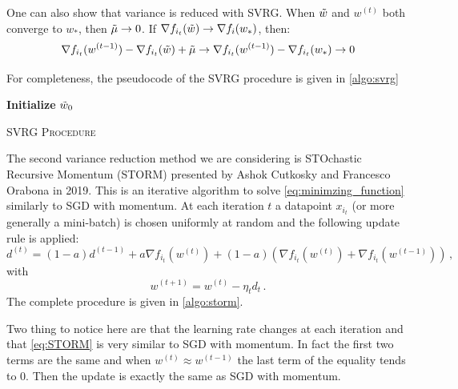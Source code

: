 \documentclass[a4paper,11pt,oneside]{report}
\begin{document}
One can also show that variance is reduced with SVRG. When $\Tilde{w}$ and $w^{(t)}$ both converge to $w_{\ast}$, then $\Tilde{\mu} \rightarrow 0$. If $\nabla f_{i_t}(\Tilde{w}) \rightarrow \nabla f_i(w_{\ast})$, then:
\begin{equation}
    \nabla f_{i_t}(w^{(t-1)}) - \nabla f_{i_t}(\Tilde{w}) + \Tilde{\mu} \rightarrow \nabla f_{i_t}(w^{(t-1)}) - \nabla f_{i_t}(w_{\ast}) \rightarrow 0
\end{equation}
        
For completeness, the pseudocode of the SVRG procedure is given in \autoref{algo:svrg}

\begin{algorithm}[H]
    \DontPrintSemicolon
    \SetAlgoNoLine
    
    \textbf{Initialize} $\Tilde{w}_0$\;
    \caption{{\textsc{SVRG Procedure}}}
    \label{algo:svrg}
\end{algorithm}

The second variance reduction method we are considering is STOchastic Recursive Momentum (STORM) presented by Ashok Cutkosky and Francesco Orabona in 2019. This is an iterative algorithm to solve \autoref{eq:minimzing_function} similarly to SGD with momentum. At each iteration $t$ a datapoint $x_{i_t}$ (or more generally a mini-batch) is chosen uniformly at random and the following update rule is applied:
\begin{equation}\label{eq:STORM}
    d^{(t)} = (1-a)d^{(t-1)} + a\nabla f_{i_t}(w^{(t)}) + (1-a)(\nabla f_{i_t}(w^{(t)}) +  \nabla f_{i_t}(w^{(t-1)}))\,,
\end{equation}
with
\begin{equation}
    w^{(t+1)} = w^{(t)} - \eta_t d_t\,.
\end{equation}
The complete procedure is given in \autoref{algo:storm}.

Two thing to notice here are that the learning rate changes at each iteration and that \autoref{eq:STORM} is very similar to SGD with momentum. In fact the first two terms are the same and when $w^{(t)} \approx w^{(t-1)}$ the last term of the equality tends to 0. Then the update is exactly the same as SGD with momentum.
\end{document}
